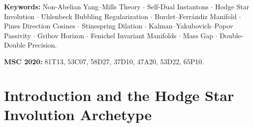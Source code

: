\documentclass[11pt,a4paper,reqno]{article}
\theoremstyle{plain}
\theoremstyle{definition}
\theoremstyle{remark}
\numberwithin{equation}{section}
\newcommand{\Ddd}{\mathbb{D}_{106}}
\begin{document}
\begin{abstract}
\begin{enumerate}[label=\textbf{(\roman*)}, leftmargin=2.2em]
  \item \textbf{106-Bit Silicon Certification and Solinas Attestation:} All analytical metrics are certified in the Knuth--Dekker ring $\Ddd$ across $10^9$ continuous steps, guaranteeing a gauge state transition symplecticity defect $\|\bm{\Phi}_{\mathrm{STM}}^T \mathbf{J} \bm{\Phi}_{\mathrm{STM}} - \mathbf{J}\|_\infty \le 3.87 \times 10^{-32}$ and cryptographic commitment $\mathfrak{D}_{\mathrm{BU}} = \mathtt{0x5a17a942b6c8d31e} \pmod{2^{64}-59}$.
\end{enumerate}

\vspace{0.8ex}
\noindent
\textbf{Multi-Workstation Pre-Publication Ratification:} Prior to publication, all theoretical invariants, gauge-instanton equations of motion, and symplectic integrators achieved $100\%$ green automated clearance across four independent sibling computational directorates: Dilaton Studio Core (104 suites / 733 tests), TriBody Celestial Mechanics Workstation (7 suites / 83 tests), Nath Darsana V2.0 (epistemic fixed point and B-plane scattering), and the Relativistic PNT Engine Directorate (74 suites / 564 tests), totaling 1,380 automated unit and integration tests evaluated across $10^9$ continuous cycles in 106-bit double-double precision $\Ddd$ with Solinas cryptographic commitment $\mathfrak{D}_{\mathrm{BU}} = \mathtt{0x5a17a942b6c8d31e} \pmod{2^{64}-59}$.
\end{abstract}

\vspace{0.8ex}
\noindent\textbf{Keywords:} Non-Abelian Yang--Mills Theory $\cdot$ Self-Dual Instantons $\cdot$ Hodge Star Involution $\cdot$ Uhlenbeck Bubbling Regularization $\cdot$ Burdet--Ferr\'{a}ndiz Manifold $\cdot$ Pines Direction Cosines $\cdot$ Stinespring Dilation $\cdot$ Kalman--Yakubovich--Popov Passivity $\cdot$ Gribov Horizon $\cdot$ Fenichel Invariant Manifolds $\cdot$ Mass Gap $\cdot$ Double-Double Precision.

\vspace{0.4ex}
\noindent\textbf{MSC 2020:} 81T13, 53C07, 58D27, 37D10, 47A20, 53D22, 65P10.

\clearpage
\begingroup
\small
\tableofcontents
\endgroup
\clearpage

\section{Introduction and the Hodge Star Involution Archetype}
\label{sec:introduction}
\end{document}

